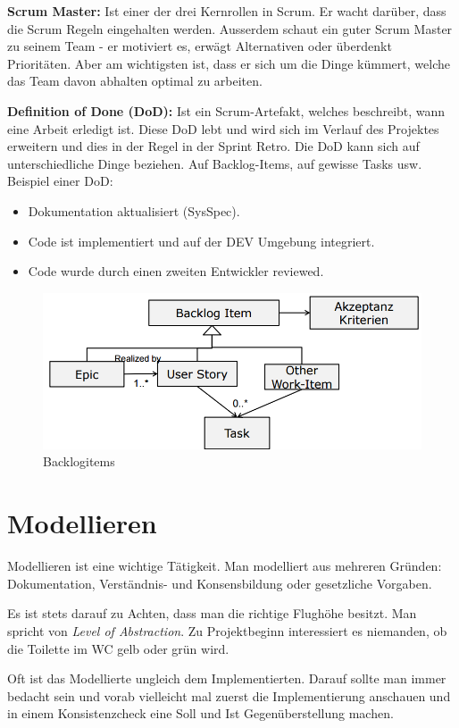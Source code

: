 \textbf{Scrum Master:} Ist einer der drei Kernrollen in Scrum. Er wacht darüber, dass die Scrum Regeln eingehalten werden. Ausserdem schaut ein guter Scrum Master zu seinem Team - er motiviert es, erwägt Alternativen oder überdenkt Prioritäten. Aber am wichtigsten ist, dass er sich um die Dinge kümmert, welche das Team davon abhalten optimal zu arbeiten.

\textbf{Definition of Done (DoD):} Ist ein Scrum-Artefakt, welches beschreibt, wann eine Arbeit erledigt ist. Diese DoD lebt und wird sich im Verlauf des Projektes erweitern und dies in der Regel in der Sprint Retro. Die DoD kann sich auf unterschiedliche Dinge beziehen. Auf Backlog-Items, auf gewisse Tasks usw. Beispiel einer DoD:

\begin{itemize}
	\item Dokumentation aktualisiert (SysSpec).
	\item Code ist implementiert und auf der DEV Umgebung integriert.
	\item Code wurde durch einen zweiten Entwickler reviewed.
\end{itemize}

\begin{figure}
\centering
\includegraphics[width=0.7\linewidth]{fig/backlogitems}
\caption{Backlogitems}
\label{fig:backlogitems}
\end{figure}

\section{Modellieren}
Modellieren ist eine wichtige Tätigkeit. Man modelliert aus mehreren Gründen: Dokumentation, Verständnis- und Konsensbildung oder gesetzliche Vorgaben.

Es ist stets darauf zu Achten, dass man die richtige Flughöhe besitzt. Man spricht von \emph{Level of Abstraction}. Zu Projektbeginn interessiert es niemanden, ob die Toilette im WC gelb oder grün wird. 

Oft ist das Modellierte ungleich dem Implementierten. Darauf sollte man immer bedacht sein und vorab vielleicht mal zuerst die Implementierung anschauen und in einem Konsistenzcheck eine Soll und Ist Gegenüberstellung machen.

